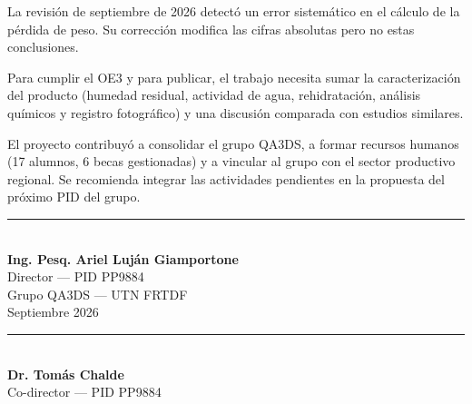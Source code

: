 \documentclass[12pt, a4paper]{article}
\newcommand{\porconf}[1]{\textcolor{orange!85!black}{#1}}
\begin{document}
La revisión de septiembre de 2026 detectó un error sistemático en el cálculo de la pérdida de peso. Su corrección modifica las cifras absolutas pero no estas conclusiones.

Para cumplir el OE3 y para publicar, el trabajo necesita sumar la caracterización del producto (humedad residual, actividad de agua, rehidratación, análisis químicos y registro fotográfico) y una discusión comparada con estudios similares.

El proyecto contribuyó a consolidar el grupo QA3DS, a formar recursos humanos (\porconf{17 alumnos}, 6 becas gestionadas) y a vincular al grupo con el sector productivo regional. Se recomienda integrar las actividades pendientes en la propuesta del próximo PID del grupo.

\vspace{1cm}

\noindent\rule{6cm}{0.5pt}\\
\textbf{Ing. Pesq. Ariel Luján Giamportone}\\
Director --- PID PP9884\\
Grupo QA3DS --- UTN FRTDF\\
Septiembre 2026

\vspace{1cm}

\noindent\rule{6cm}{0.5pt}\\
\textbf{Dr. Tomás Chalde}\\
Co-director --- PID PP9884
\end{document}
